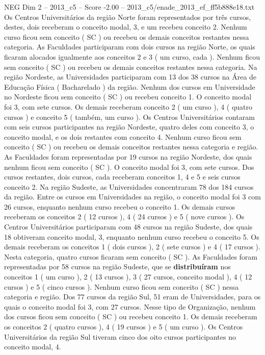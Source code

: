 \begin{textsample}{NEG Dim 2 – 2013\_c5 – Score -2.00 – 2013\_c5/enade\_2013\_ef\_ff5b888e18.txt}
Os Centros Universitários da região Norte foram representados por três cursos, destes, dois receberam o conceito modal, 3, e um recebeu conceito 2.
Nenhum curso ficou sem conceito ( SC ) ou recebeu os demais conceitos restantes nessa categoria.
As Faculdades participaram com dois cursos na região Norte, os quais ficaram alocados igualmente aos conceitos 2 e 3 ( um curso, cada ).
Nenhum ficou sem conceito ( SC ) ou recebeu os demais conceitos restantes nessa categoria.
Na região Nordeste, as Universidades participaram com 13 dos 38 cursos na Área de Educação Física ( Bacharelado ) da região.
Nenhum dos cursos em Universidade no Nordeste ficou sem conceito ( SC ) ou recebeu conceito 1.
O conceito modal foi 3, com sete cursos.
Os demais receberam conceito 2 ( um curso ), 4 ( quatro cursos ) e conceito 5 ( também, um curso ).
Os Centros Universitários contaram com seis cursos participantes na região Nordeste, quatro deles com conceito 3, o conceito modal, e os dois restantes com conceito 4.
Nenhum curso ficou sem conceito ( SC ) ou recebeu os demais conceitos restantes nessa categoria e região.
As Faculdades foram representadas por 19 cursos na região Nordeste, dos quais nenhum ficou sem conceito ( SC ).
O conceito modal foi 3, com sete cursos.
Dos cursos restantes, dois cursos, cada receberam conceitos 1, 4 e 5 e seis cursos conceito 2.
Na região Sudeste, as Universidades concentraram 78 dos 184 cursos da região.
Entre os cursos em Universidades na região, o conceito modal foi 3 com 26 cursos, enquanto nenhum curso recebeu o conceito 1.
Os demais cursos receberam os conceitos 2 ( 12 cursos ), 4 ( 24 cursos ) e 5 ( nove cursos ).
Os Centros Universitários participaram com 48 cursos na região Sudeste, dos quais 18 obtiveram conceito modal, 3, enquanto nenhum curso recebeu o conceito 5.
Os demais receberam os conceitos 1 ( dois cursos ), 2 ( sete cursos ) e 4 ( 17 cursos ).
Nesta categoria, quatro cursos ficaram sem conceito ( SC ).
As Faculdades foram representadas por 58 cursos na região Sudeste, que se \textbf{distribuíram} nos conceitos 1 ( um curso ), 2 ( 13 cursos ), 3 ( 27 cursos, conceito modal ), 4 ( 12 cursos ) e 5 ( cinco cursos ).
Nenhum curso ficou sem conceito ( SC ) nessa categoria e região.
Dos 77 cursos da região Sul, 51 eram de Universidades, para os quais o conceito modal foi 3, com 27 cursos.
Nesse tipo de Organização, nenhum dos cursos ficou sem conceito ( SC ) ou recebeu conceito 1.
Os demais receberam os conceitos 2 ( quatro cursos ), 4 ( 19 cursos ) e 5 ( um curso ).
Os Centros Universitários da região Sul tiveram cinco dos oito cursos participantes no conceito modal, 4.

\end{textsample}
